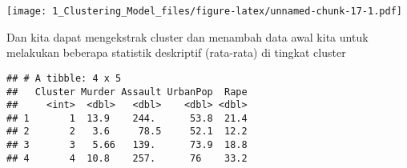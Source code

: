 \documentclass[]{article}
\newenvironment{Shaded}{\begin{snugshade}}{\end{snugshade}}
\newcommand{\DataTypeTok}[1]{\textcolor[rgb]{0.13,0.29,0.53}{#1}}
\newcommand{\KeywordTok}[1]{\textcolor[rgb]{0.13,0.29,0.53}{\textbf{#1}}}
\newcommand{\NormalTok}[1]{#1}
\newcommand{\OperatorTok}[1]{\textcolor[rgb]{0.81,0.36,0.00}{\textbf{#1}}}
\newcommand{\StringTok}[1]{\textcolor[rgb]{0.31,0.60,0.02}{#1}}
\begin{document}
\texttt{[image: 1\_Clustering\_Model\_files/figure-latex/unnamed-chunk-17-1.pdf]}

Dan kita dapat mengekstrak cluster dan menambah data awal kita untuk
melakukan beberapa statistik deskriptif (rata-rata) di tingkat cluster

\begin{Shaded}
\end{Shaded}

\begin{verbatim}
## # A tibble: 4 x 5
##   Cluster Murder Assault UrbanPop  Rape
##     <int>  <dbl>   <dbl>    <dbl> <dbl>
## 1       1  13.9    244.      53.8  21.4
## 2       2   3.6     78.5     52.1  12.2
## 3       3   5.66   139.      73.9  18.8
## 4       4  10.8    257.      76    33.2
\end{verbatim}
\end{document}
